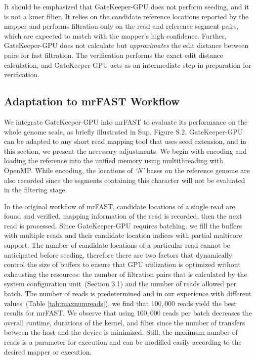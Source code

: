 It should be emphasized that GateKeeper-GPU does not perform seeding, and it is not a kmer filter. It relies on the candidate reference locations reported by the mapper and performs filtration only on the read and reference segment pairs, which are expected to match with the mapper's high confidence. Further, GateKeeper-GPU does not calculate but \textit{approximates} the edit distance between pairs for fast filtration. The verification performs the exact edit distance calculation, and GateKeeper-GPU acts as an intermediate step in preparation for verification.

\subsection{Adaptation to mrFAST Workflow}
We integrate GateKeeper-GPU into mrFAST to evaluate its performance on the whole genome scale, as briefly illustrated in Sup. Figure S.2. GateKeeper-GPU can be adapted to any short read mapping tool that uses seed extension, and in this section, we present the necessary adjustments. We begin with encoding and loading the reference into the unified memory using multithreading with OpenMP. While encoding, the locations of \textit{`N'} bases on the reference genome are also recorded since the segments containing this character will not be evaluated in the filtering stage. 

In the original workflow of mrFAST, candidate locations of a single read are found and verified, mapping information of the read is recorded, then the next read is processed. Since GateKeeper-GPU requires batching, we fill the buffers with multiple reads and their candidate location indices with partial multicore support. The number of candidate locations of a particular read cannot be anticipated before seeding, therefore there are two factors that dynamically control the size of buffers to ensure that GPU utilization is optimized without exhausting the resources: the number of filtration pairs that is calculated by the system configuration unit~(Section 3.1) and the number of reads allowed per batch. The number of reads is predetermined and in our experience with different values~(Table \ref{tab:maxnumreads}), we find that $100,000$ reads yield the best results for mrFAST. We observe that using $100,000$ reads per batch decreases the overall runtime, durations of the kernel, and filter since the number of transfers between the host and the device is minimized. Still, the maximum number of reads is a parameter for execution and can be modified easily according to the desired mapper or execution.

